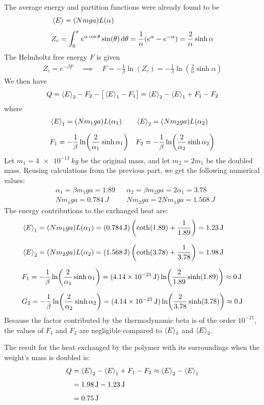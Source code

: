 \documentclass[11pt, a4paper]{article}
\newcommand*\diff{\mathop{}\!\mathrm{d}} %
\begin{document}
The average energy and partition functions were already found to be
\begin{align*}
	&\expval{E} = (N mga )L(\alpha) \\[1.0ex]
	&Z_c = \int_{0}^{\pi} e^{\alpha \cos \theta} \sin (\theta)\diff \theta = \frac{1}{\alpha} (e^{\alpha} - e^{-\alpha})= \frac{2}{\alpha } \sinh \alpha
\end{align*}
The Helmholtz free energy $ F $ is given 
\begin{align*}
	Z_c = e^{-\beta F} \quad \implies \quad F = - \frac{1}{\beta} \ln (Z_c) = -\frac{1}{\beta} \ln(\frac{2}{\alpha} \sinh \alpha)
\end{align*}
We then have
\begin{align*}
	Q = \expval{E}_2 - F_2 - \big[  \expval{E}_1 - F_1  \big] = \expval{E}_2 - \expval{E}_1 + F_1 - F_2
\end{align*}
where
\begin{align*}
	& \expval{E}_1 = (N m_1ga )L(\alpha_1) && \expval{E}_2 = (N m_2ga )L(\alpha_2) \\[1.5ex]
	& F_1 = -\frac{1}{\beta} \ln(\frac{2}{\alpha_1} \sinh \alpha_1) && F_2 = -\frac{1}{\beta} \ln(\frac{2}{\alpha_2} \sinh \alpha_2)
\end{align*}
Let $ m_1 = \SI{4e-13}{kg} $ be the original mass, and let $ m_2 = 2m_1 $ be the doubled mass. Reusing calculations from the previous part, we get the following numerical values:
\begin{align*}
	&\alpha_1 = \beta m_1 g a = 1.89 && \alpha_2 = \beta m_2 g a = 2 \alpha _1 =  3.78\\[1.0ex]
	& N m_1 g a = \SI{0.784}{J} && N m_2 g a = 2 N m_1 g a = \SI{1.568}{J}
\end{align*}
The energy contributions to the exchanged heat are:
\begin{align*}
	& \expval{E}_1 = (N m_1ga )L(\alpha_1) = (\SI{0.784}{J}) \left(\coth(1.89) + \frac{1}{1.89} \right) = \SI{1.23}{J} \\[1.5ex]
	&\expval{E}_2 = (N m_2ga )L(\alpha_2) = (\SI{1.568}{J})\left(\coth(3.78) + \frac{1}{3.78} \right) =  \SI{1.98}{J} \\[1.5ex]
	& F_1 = -\frac{1}{\beta} \ln(\frac{2}{\alpha_1} \sinh \alpha_1) = (\SI{4.14e-21}{J})  \ln(\frac{2}{1.89} \sinh (1.89)) \approx  \SI{0}{J}  \\[1.5ex]
	&G_2 = -\frac{1}{\beta} \ln(\frac{2}{\alpha_2} \sinh \alpha_2) = (\SI{4.14e-21}{J})  \ln(\frac{2}{3.78} \sinh (3.78)) \approx \SI{0}{J}
\end{align*}
Because the factor contributed by the thermodynamic beta is of the order $ 10^{-21} $, the values of $ F_1 $ and $ F_2 $ are negligible compared to $ \expval{E}_1  $ and $ \expval{E}_2 $.

The result for the heat exchanged by the polymer with its surroundings when the weight's mass is doubled is:
\begin{align*}
	Q &= \expval{E}_2 - \expval{E}_1 + F_1 - F_2 \approx \expval{E}_2 - \expval{E}_1\\[1.0ex]	
	&= \SI{1.98}{J} - \SI{1.23}{J}\\[1.0ex]
	&= \SI{0.75}{J}
\end{align*}
\end{document}
